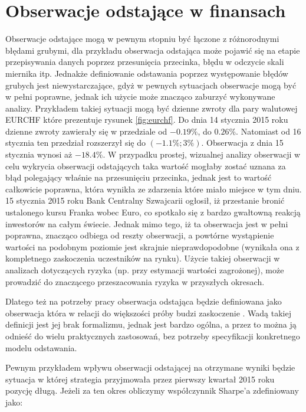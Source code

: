 \documentclass[a4paper,12pt,openany, DIV=calc, headsepline]{scrbook}
\begin{document}
\section{Obserwacje odstające w finansach}

Obserwacje odstające mogą w pewnym stopniu być łączone z różnorodnymi błędami grubymi, dla przykładu obserwacja odstająca może pojawić się na etapie przepisywania danych poprzez przesunięcia przecinka, błędu w odczycie skali miernika itp. Jednakże definiowanie odstawania poprzez występowanie błędów grubych jest niewystarczające, gdyż w pewnych sytuacjach obserwacje mogą być w pełni poprawne, jednak ich użycie może znacząco zaburzyć wykonywane analizy. Przykładem takiej sytuacji mogą być dzienne zwroty dla pary walutowej EURCHF które prezentuje rysunek \ref{fig:eurchf}. Do dnia 14 stycznia 2015 roku dzienne zwroty zawierały się w przedziale od $-0.19\%$, do $0.26\%$. Natomiast od 16 stycznia ten przedział rozszerzył się do $(-1.1 \%; 3\%)$. Obserwacja z dnia 15 stycznia wynosi aż $-18.4\%$. W przypadku prostej, wizualnej analizy obserwacji w celu wykrycia obserwacji odstających taka wartość mogłaby zostać uznana za błąd polegający właśnie na przesunięciu przecinka, jednak jest to wartość całkowicie poprawna, która wynikła ze zdarzenia które miało miejsce w tym dniu. 15 stycznia 2015 roku Bank Centralny Szwajcarii ogłosił, iż przestanie bronić ustalonego kursu Franka wobec Euro, co spotkało się z bardzo gwałtowną reakcją inwestorów na całym świecie. Jednak mimo tego, iż ta obserwacja jest w pełni poprawna, znacząco odbiega od reszty obserwacji, a powtórne wystąpienie wartości na podobnym poziomie jest skrajnie nieprawdopodobne (wynikała ona z kompletnego zaskoczenia uczestników na rynku). Użycie takiej obserwacji w analizach dotyczących ryzyka (np. przy estymacji wartości zagrożonej), może prowadzić do znaczącego przeszacowania ryzyka w przyszłych okresach.

Dlatego też na potrzeby pracy obserwacja odstająca będzie definiowana jako obserwacja która w relacji do większości próby budzi zaskoczenie \citep{Ripley2004}. Wadą takiej definicji jest jej brak formalizmu, jednak jest bardzo ogólna, a przez to można ją odnieść do wielu praktycznych zastosowań, bez potrzeby specyfikacji konkretnego modelu odstawania.

Pewnym przykładem wpływu obserwacji odstającej na otrzymane wyniki będzie sytuacja w której strategia przyjmowała przez pierwszy kwartał 2015 roku pozycję długą. Jeżeli za ten okres obliczymy współczynnik Sharpe'a zdefiniowany jako:
\end{document}
